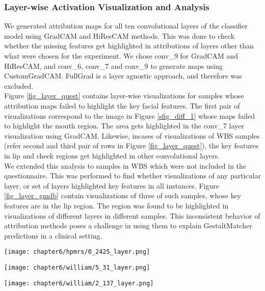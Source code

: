 \documentclass[../report.tex]{subfiles}
\begin{document}
    \subsubsection{Layer-wise Activation Visualization and Analysis} \label{sec_layer_wise}
    We generated attribution maps for all ten convolutional layers of the classifier model using GradCAM and HiResCAM methods. This was done to check whether the missing features get highlighted in attributions of layers other than what were chosen for the experiment. We chose conv\_9 for GradCAM and HiResCAM, and conv\_6, conv\_7 and conv\_9 to generate maps using CustomGradCAM. FullGrad is a layer agnostic approach, and therefore was excluded.\\
	Figure \ref{fig_layer_quest} contains layer-wise visualizations for samples whose attribution maps failed to highlight the key facial features. The first pair of visualizations correspond to the image in Figure \ref{sfig_diff_1} whose maps failed to highlight the mouth region. The area gets highlighted in the conv\_7 layer visualization using GradCAM. Likewise, incases of visualizations of WBS samples (refer second and third pair of rows in Figure \ref{fig_layer_quest}), the key features in lip and cheek regions get highlighted in other convolutional layers.\\
	We extended this analysis to samples in WBS which were not included in the questionnaire. This was performed to find whether visualizations of any particular layer, or set of layers highlighted  key features in all instances. Figure \ref{fig_layer_gmdb} contain visualizations of three of such samples, whose key features are in the lip region. The region was found to be highlighted in visualizations of different layers in different samples. This inconsistent behavior of attribution methods poses a challenge in using them to explain GestaltMatcher predictions in a clinical setting.  
    \begin{sidewaysfigure}
    	\texttt{[image: chapter6/hpmrs/0\_2425\_layer.png]}
    	
    	\texttt{[image: chapter6/william/5\_31\_layer.png]}
	      
    	\texttt{[image: chapter6/william/2\_137\_layer.png]}
    	\caption[Example layer-wise activation map visualizations for instances presented in the questionnaire]{Example layer-wise activation map visualizations for instances presented in the questionnaire. Layers highlighting syndromic features are boxed in red.}
	   \label{fig_layer_quest}	
    \end{sidewaysfigure}
\end{document}
